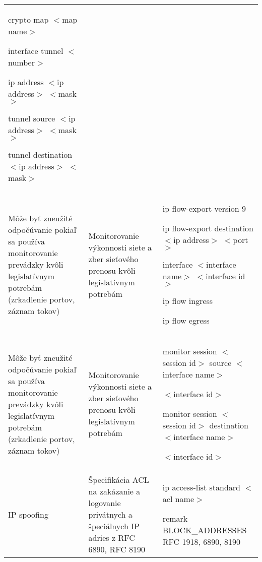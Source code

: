 \begin{longtable}[!htbp]{|L{10em}L{10em}>{\selectfont}L{34em}|}
	\hspace{0.5em}crypto map $<$map name$>$
	
	interface tunnel $<$number$>$
	
	\hspace{0.5em}ip address $<$ip address$>$ $<$mask$>$
	
	\hspace{0.5em}tunnel source $<$ip address$>$ $<$mask$>$
	
	\hspace{0.5em}tunnel destination $<$ip address$>$ $<$mask$>$\\
	
	
	
	
	Môže byť zneužité odpočúvanie pokiaľ sa používa monitorovanie prevádzky kvôli legislatívnym potrebám	(zrkadlenie portov, záznam tokov) &Monitorovanie výkonnosti siete a zber sieťového prenosu kvôli legislatívnym potrebám	&ip flow-export version 9
	
	
	ip flow-export destination $<$ip address$>$ $<$port$>$
	
	interface $<$interface name$>$ $<$interface id$>$
	
	\hspace{0.5em}ip flow ingress
	
	\hspace{0.5em}ip flow egress\\
	
	
	
	
	 Môže byť zneužité odpočúvanie pokiaľ sa používa monitorovanie prevádzky kvôli legislatívnym potrebám (zrkadlenie portov, záznam tokov)&Monitorovanie výkonnosti siete a zber sieťového prenosu kvôli legislatívnym potrebám	&monitor session $<$session id$>$ source $<$interface name$>$ 
	
	\hspace{0.5em}$<$interface id$>$
	
	monitor session $<$session id$>$ destination $<$interface name$>$ 
	
	\hspace{0.5em}$<$interface id$>$\\
	
	
	
	
	IP spoofing	&Špecifikácia ACL na zakázanie a logovanie privátnych a špeciálnych IP adries z RFC 6890, RFC 8190	&ip access-list standard $<$acl name$>$
	
	\hspace{0.5em}remark BLOCK\_ADDRESSES RFC 1918, 6890, 8190
	

\end{longtable}
